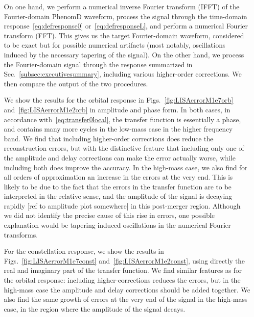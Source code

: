 \documentclass[aps,showpacs,twocolumn,
prd,superscriptaddress,nofootinbib]{revtex4-1}
\newcommand{\SM}[1]{{\color{Red} #1}}
\begin{document}
On one hand, we perform a numerical inverse Fourier transform (IFFT) of the Fourier-domain PhenomD waveform, process the signal through the time-domain response~\eqref{eq:defresponse0} or~\eqref{eq:defresponseL}, and perform a numerical Fourier transform (FFT). This gives us the target Fourier-domain waveform, considered to be exact but for possible numerical artifacts (most notably, oscillations induced by the necessary tapering of the signal). On the other hand, we process the Fourier-domain signal through the response summarized in Sec.~\ref{subsec:executivesummary}, including various higher-order corrections. We then compare the output of the two procedures.

We show the results for the orbital response in Figs.~\ref{fig:LISAerrorM1e7orb} and~\ref{fig:LISAerrorM1e2orb} in amplitude and phase form. In both cases, in accordance with~\eqref{eq:transfer0local}, the transfer function is essentially a phase, and contains many more cycles in the low-mass case in the higher frequency band. We find that including higher-order corrections does reduce the reconstruction errors, but with the distinctive feature that including only one of the amplitude and delay corrections can make the error actually worse, while including both does improve the accuracy. In the high-mass case, we also find for all orders of approximation an increase in the errors at the very end. This is likely to be due to the fact that the errors in the transfer function are to be interpreted in the relative sense, and the amplitude of the signal is decaying rapidly \SM{[ref to amplitude plot somewhere]} in this post-merger region. Although we did not identify the precise cause of this rise in errors, one possible explanation would be tapering-induced oscillations in the numerical Fourier transforms.

For the constellation response, we show the results in Figs.~\ref{fig:LISAerrorM1e7const} and~\ref{fig:LISAerrorM1e2const}, using directly the real and imaginary part of the transfer function. We find similar features as for the orbital response: including higher-corrections reduces the errors, but in the high-mass case the amplitude and delay corrections should be added together. We also find the same growth of errors at the very end of the signal in the high-mass case, in the region where the amplitude of the signal decays.
\end{document}
